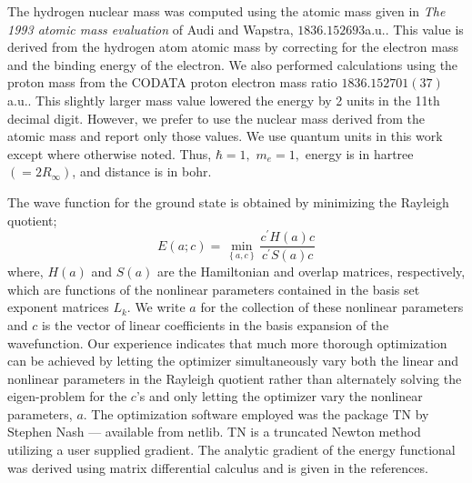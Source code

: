 The hydrogen nuclear mass was computed
using the atomic mass given in \emph{The 1993 atomic mass evaluation} of
Audi and Wapstra\cite{Audi93}, $1836.152693$a.u.. This value is derived
from the hydrogen atom atomic mass by correcting for the electron mass 
and the binding energy of the electron. We also performed calculations
using the proton mass from the CODATA\cite{CODATAweb} 
proton electron mass ratio $1836.152701(37)$a.u.. This slightly larger
mass value lowered the energy by 2 units in the 11th decimal digit.
However, we prefer to use the nuclear mass derived from the atomic
mass and report only those values. 
We use quantum units in this work except where
otherwise noted. Thus, $\hbar =1,$ $m_e=1,$ energy is in hartree$\left(
=2R_\infty \right) $, and distance is in bohr. 

The wave function for the ground state is obtained by minimizing
the Rayleigh quotient; 
\begin{equation}
E\left( a;c\right) =\min_{\left\{ a,c\right\} }\frac{c^{\prime }H(a)c}{
c^{\prime }S(a)c}  \label{energy}
\end{equation}
where,
$H\left( a\right) $ and $S\left( a\right) $ are the Hamiltonian and overlap
matrices, respectively, 
which are functions of the nonlinear parameters contained in the
basis set exponent matrices $L_k$. We write $a$ for the collection of these
nonlinear parameters and $c$ is the vector of linear coefficients in the basis
expansion of the wavefunction.
Our experience indicates that 
much more thorough optimization can be achieved
by letting the optimizer
simultaneously vary both the linear and nonlinear parameters in the
Rayleigh quotient rather than alternately solving the eigen-problem for
the $c$'s and only letting the optimizer vary the nonlinear parameters, $a$.
The optimization software employed was the package TN by Stephen Nash\cite
{NashTN} --- available from netlib\cite{netlib}. TN is a truncated Newton
method utilizing a user supplied gradient. The analytic gradient of the
energy functional was derived using matrix 
differential calculus\cite{Kinghorn95a,Kinghorn95b} and is given in 
the references\cite{Kinghorn99a}.

